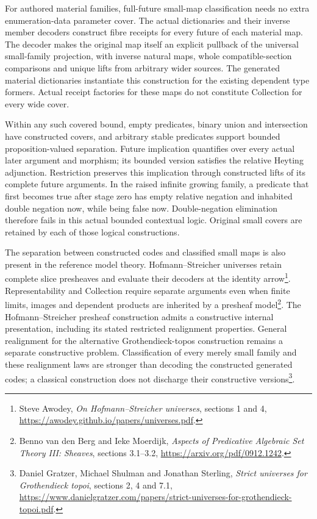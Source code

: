 \documentclass[11pt]{article}
\theoremstyle{definition}
\theoremstyle{remark}
\begin{document}
For authored material families, full-future small-map classification needs
no extra enumeration-data parameter cover.  The actual dictionaries and
their inverse member decoders construct fibre receipts for every future of
each material map.  The decoder makes the original map itself an explicit
pullback of the universal small-family projection, with inverse natural
maps, whole compatible-section comparisons and unique lifts from arbitrary
wider sources.  The generated material dictionaries instantiate this
construction for the existing dependent type formers.  Actual receipt
factories for these maps do not constitute Collection for every wide cover.

Within any such covered bound, empty predicates, binary union and
intersection have constructed covers, and arbitrary stable predicates
support bounded proposition-valued separation.  Future implication
quantifies over every actual later argument and morphism; its bounded
version satisfies the relative Heyting adjunction.  Restriction preserves
this implication through constructed lifts of its complete future
arguments.  In the raised infinite growing family, a predicate that first
becomes true after stage zero has empty relative negation and inhabited
double negation now, while being false now.  Double-negation elimination
therefore fails in this actual bounded contextual logic.  Original small
covers are retained by each of those logical constructions.

The separation between constructed codes and classified small maps is
also present in the reference model theory.  Hofmann--Streicher universes
retain complete slice presheaves and evaluate their decoders at the
identity arrow\footnote{Steve Awodey, \emph{On Hofmann--Streicher
universes}, sections 1 and 4,
\url{https://awodey.github.io/papers/universes.pdf}.}.
Representability and Collection require separate arguments even when
finite limits, images and dependent products are inherited by a presheaf
model\footnote{Benno van den Berg and Ieke Moerdijk, \emph{Aspects of
Predicative Algebraic Set Theory III: Sheaves}, sections 3.1--3.2,
\url{https://arxiv.org/pdf/0912.1242}.}.
The Hofmann--Streicher presheaf construction admits a constructive
internal presentation, including its stated restricted realignment
properties.  General realignment for the alternative Grothendieck-topos
construction remains a separate constructive problem.  Classification
of every merely small family and these realignment laws are stronger
than decoding the constructed generated codes; a classical construction
does not discharge their constructive versions\footnote{Daniel Gratzer, Michael Shulman and
Jonathan Sterling, \emph{Strict universes for Grothendieck topoi},
sections 2, 4 and 7.1,
\url{https://www.danielgratzer.com/papers/strict-universes-for-grothendieck-topoi.pdf}.}.
\end{document}
